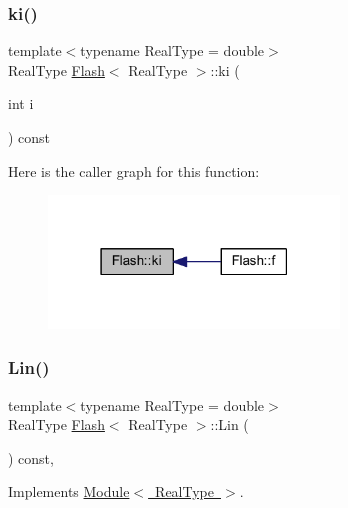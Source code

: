 \subsubsection{\texorpdfstring{ki()}{ki()}}
{\footnotesize\ttfamily template$<$typename Real\+Type = double$>$ \\
Real\+Type \mbox{\hyperlink{class_flash}{Flash}}$<$ Real\+Type $>$\+::ki (\begin{DoxyParamCaption}\item[{int}]{i }\end{DoxyParamCaption}) const\hspace{0.3cm}{\ttfamily [inline]}}

Here is the caller graph for this function\+:\nopagebreak
\begin{figure}[H]
\begin{center}
\leavevmode
\includegraphics[width=219pt]{class_flash_ae7582896021d0734356b1b5253ac68f1_icgraph}
\end{center}
\end{figure}
\mbox{\label{class_flash_a074095aaca2230d0bc8d9e5cc513086c}} 
\subsubsection{\texorpdfstring{Lin()}{Lin()}}
{\footnotesize\ttfamily template$<$typename Real\+Type = double$>$ \\
Real\+Type \mbox{\hyperlink{class_flash}{Flash}}$<$ Real\+Type $>$\+::Lin (\begin{DoxyParamCaption}{ }\end{DoxyParamCaption}) const\hspace{0.3cm}{\ttfamily [inline]}, {\ttfamily [virtual]}}



Implements \mbox{\hyperlink{class_module_afd5ad051a1d37aac40709badad675732}{Module$<$ Real\+Type $>$}}.

